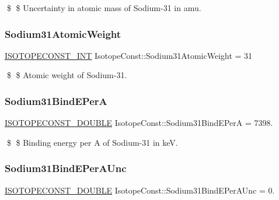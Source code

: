 \$ \$ Uncertainty in atomic mass of Sodium-\/31 in amu. \mbox{\label{group___isotope_const-_sodium-_na31_ga870a1e89de90cf785b7af761cbeb4395}} 
\subsubsection{\texorpdfstring{Sodium31\+Atomic\+Weight}{Sodium31AtomicWeight}}
{\footnotesize\ttfamily \mbox{\hyperlink{group___isotope_const-_macros_ga5f18360b3e99483a35c32d789e62621c}{I\+S\+O\+T\+O\+P\+E\+C\+O\+N\+S\+T\+\_\+\+I\+NT}} Isotope\+Const\+::\+Sodium31\+Atomic\+Weight = 31}

\$ \$ Atomic weight of Sodium-\/31. \mbox{\label{group___isotope_const-_sodium-_na31_gaaf3299923322c54336cb5167edc2c76c}} 
\subsubsection{\texorpdfstring{Sodium31\+Bind\+E\+PerA}{Sodium31BindEPerA}}
{\footnotesize\ttfamily \mbox{\hyperlink{group___isotope_const-_macros_ga8f45a7272ce02c0b4c65c44636ed719a}{I\+S\+O\+T\+O\+P\+E\+C\+O\+N\+S\+T\+\_\+\+D\+O\+U\+B\+LE}} Isotope\+Const\+::\+Sodium31\+Bind\+E\+PerA = 7398.}

\$ \$ Binding energy per A of Sodium-\/31 in keV. \mbox{\label{group___isotope_const-_sodium-_na31_gac7c40b0c3308191f5c06cca51b3c0e79}} 
\subsubsection{\texorpdfstring{Sodium31\+Bind\+E\+Per\+A\+Unc}{Sodium31BindEPerAUnc}}
{\footnotesize\ttfamily \mbox{\hyperlink{group___isotope_const-_macros_ga8f45a7272ce02c0b4c65c44636ed719a}{I\+S\+O\+T\+O\+P\+E\+C\+O\+N\+S\+T\+\_\+\+D\+O\+U\+B\+LE}} Isotope\+Const\+::\+Sodium31\+Bind\+E\+Per\+A\+Unc = 0.}

